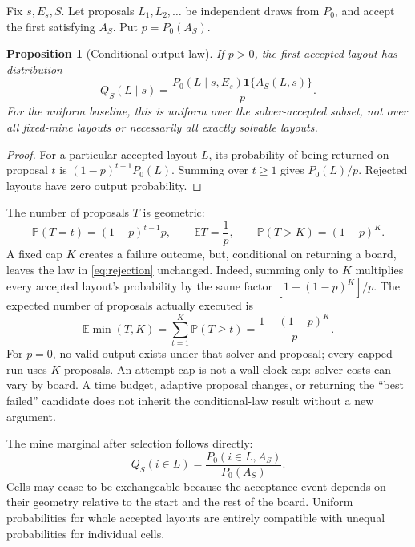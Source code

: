\documentclass[11pt]{article}
\newtheorem{proposition}{Proposition}
\newcommand{\Prb}{\mathbb P}
\newcommand{\E}{\mathbb E}
\newcommand{\ind}{\mathbf 1}
\begin{document}
Fix $s,E_s,S$. Let proposals $L_1,L_2,\ldots$ be independent draws from $P_0$, and accept the first satisfying $A_S$. Put $p=P_0(A_S)$.

\begin{proposition}[Conditional output law]
If $p>0$, the first accepted layout has distribution
\begin{equation}
 Q_S(L\mid s)=\frac{P_0(L\mid s,E_s)\ind\{A_S(L,s)\}}{p}.
 \label{eq:rejection}
\end{equation}
For the uniform baseline, this is uniform over the \emph{solver-accepted subset}, not over all fixed-mine layouts or necessarily all exactly solvable layouts.
\end{proposition}
\begin{proof}
For a particular accepted layout $L$, its probability of being returned on proposal $t$ is $(1-p)^{t-1}P_0(L)$. Summing over $t\ge1$ gives $P_0(L)/p$. Rejected layouts have zero output probability.
\end{proof}

The number of proposals $T$ is geometric:
\begin{equation}
 \Prb(T=t)=(1-p)^{t-1}p,\qquad \E T=\frac1p,\qquad
 \Prb(T>K)=(1-p)^K.
 \label{eq:geometric}
\end{equation}
A fixed cap $K$ creates a failure outcome, but, conditional on returning a board, leaves the law in \eqref{eq:rejection} unchanged. Indeed, summing only to $K$ multiplies every accepted layout's probability by the same factor $[1-(1-p)^K]/p$. The expected number of proposals actually executed is
\begin{equation}
 \E\min(T,K)=\sum_{t=1}^K\Prb(T\ge t)=\frac{1-(1-p)^K}{p}.
 \label{eq:cap}
\end{equation}
For $p=0$, no valid output exists under that solver and proposal; every capped run uses $K$ proposals. An attempt cap is not a wall-clock cap: solver costs can vary by board. A time budget, adaptive proposal changes, or returning the ``best failed'' candidate does not inherit the conditional-law result without a new argument.

The mine marginal after selection follows directly:
\begin{equation}
 Q_S(i\in L)=\frac{P_0(i\in L, A_S)}{P_0(A_S)}.
 \label{eq:marginal}
\end{equation}
Cells may cease to be exchangeable because the acceptance event depends on their geometry relative to the start and the rest of the board. Uniform probabilities for whole accepted layouts are entirely compatible with unequal probabilities for individual cells.
\end{document}
